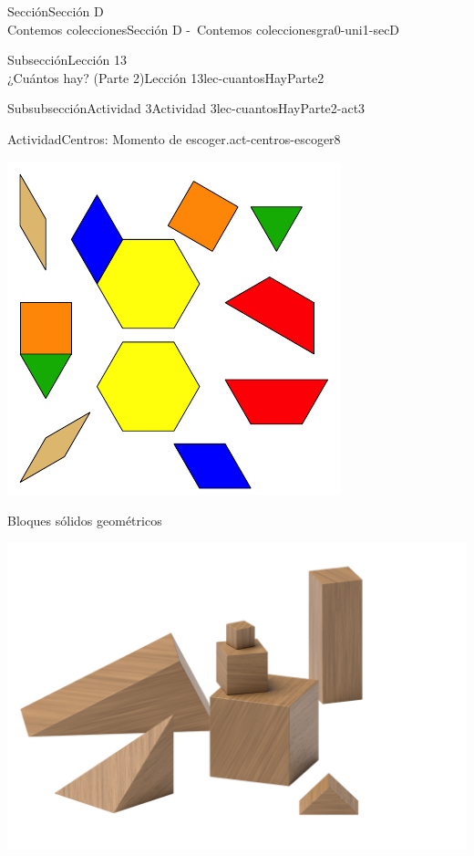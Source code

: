 \begin{sectionptx}{Sección}{{\Large Sección D\\}Contemos colecciones}{}{Sección D -~Contemos colecciones}{}{}{gra0-uni1-secD}
\begin{subsectionptx}{Subsección}{{\normalsize Lección 13\\[-0.05cm]}¿Cuántos hay? (Parte 2)}{}{Lección 13}{}{}{lec-cuantosHayParte2}
\begin{subsubsectionptx}{Subsubsección}{Actividad 3}{}{Actividad 3}{}{}{lec-cuantosHayParte2-act3}
\begin{activity}{Actividad}{Centros: Momento de escoger.}{act-centros-escoger8}
\begin{sidebyside}{2}{0.025}{0.025}{0.05}
\begin{sbspanel}{0.45}
\includegraphics[max width=\linewidth, center]{external/svg-source/tikz-file-147344.pdf}
\end{sbspanel}%
\end{sidebyside}%
\vspace*{1ex minus 0.8ex}
\begin{sidebyside}{2}{0.025}{0.025}{0.05}%
\begin{sbspanel}{0.45}%
Bloques sólidos geométricos%
\par
\includegraphics[max width=\linewidth, center]{external/png-source/K.1.A Beta Student Workbook.Geoblocks.png}

\end{sbspanel}
\end{sidebyside}
\end{activity}
\end{subsubsectionptx}
\end{subsectionptx}
\end{sectionptx}
